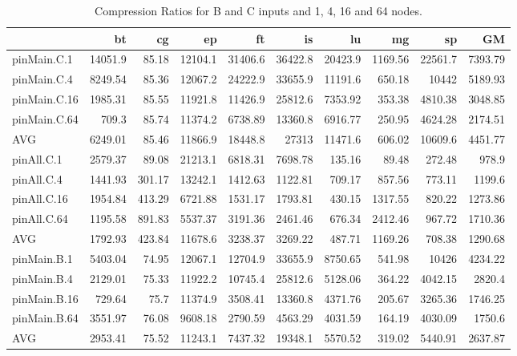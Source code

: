 \begin{table*}[]
\caption{Compression Ratios for B and C inputs and 1, 4, 16 and 64 nodes.}
\begin{center}
\label{cr_pMpA_BC_itn_p3.5}
\begin{tabular}{|l|rrrrrrrr|r|}
\hline
              &      bt &      cg &      ep &      ft &      is &      lu &      mg &      sp &      GM \\
\hline
 pinMain.C.1  & 14051.9 &   85.18 & 12104.1 & 31406.6 & 36422.8 & 20423.9 & 1169.56 & 22561.7 & 7393.79 \\
 pinMain.C.4  & 8249.54 &   85.36 & 12067.2 & 24222.9 & 33655.9 & 11191.6 &  650.18 &   10442 & 5189.93 \\
 pinMain.C.16 & 1985.31 &   85.55 & 11921.8 & 11426.9 & 25812.6 & 7353.92 &  353.38 & 4810.38 & 3048.85 \\
 pinMain.C.64 &   709.3 &   85.74 & 11374.2 & 6738.89 & 13360.8 & 6916.77 &  250.95 & 4624.28 & 2174.51 \\
 \hline
 AVG          & 6249.01 &   85.46 & 11866.9 & 18448.8 &   27313 & 11471.6 &  606.02 & 10609.6 & 4451.77 \\
 \hline
 pinAll.C.1   & 2579.37 &   89.08 & 21213.1 & 6818.31 & 7698.78 &  135.16 &   89.48 &  272.48 &   978.9 \\
 pinAll.C.4   & 1441.93 &  301.17 & 13242.1 & 1412.63 & 1122.81 &  709.17 &  857.56 &  773.11 &  1199.6 \\
 pinAll.C.16  & 1954.84 &  413.29 & 6721.88 & 1531.17 & 1793.81 &  430.15 & 1317.55 &  820.22 & 1273.86 \\
 pinAll.C.64  & 1195.58 &  891.83 & 5537.37 & 3191.36 & 2461.46 &  676.34 & 2412.46 &  967.72 & 1710.36 \\
 \hline
 AVG          & 1792.93 &  423.84 & 11678.6 & 3238.37 & 3269.22 &  487.71 & 1169.26 &  708.38 & 1290.68 \\
 \hline
 pinMain.B.1  & 5403.04 &   74.95 & 12067.1 & 12704.9 & 33655.9 & 8750.65 &  541.98 &   10426 & 4234.22 \\
 pinMain.B.4  & 2129.01 &   75.33 & 11922.2 & 10745.4 & 25812.6 & 5128.06 &  364.22 & 4042.15 &  2820.4 \\
 pinMain.B.16 &  729.64 &    75.7 & 11374.9 & 3508.41 & 13360.8 & 4371.76 &  205.67 & 3265.36 & 1746.25 \\
 pinMain.B.64 & 3551.97 &   76.08 & 9608.18 & 2790.59 & 4563.29 & 4031.59 &  164.19 & 4030.09 &  1750.6 \\
 \hline
 AVG          & 2953.41 &   75.52 & 11243.1 & 7437.32 & 19348.1 & 5570.52 &  319.02 & 5440.91 & 2637.87 \\

\end{tabular}
\end{center}
\end{table*}
